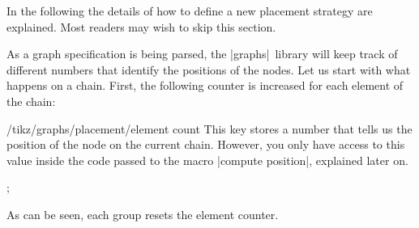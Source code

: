 In the following the details of how to define a new placement strategy are
explained. Most readers may wish to skip this section.

As a graph specification is being parsed, the |graphs| library will keep track
of different numbers that identify the positions of the nodes. Let us start
with what happens on a chain. First, the following counter is increased for
each element of the chain:
%
\begin{key}{/tikz/graphs/placement/element count}
    This key stores a number that tells us the position of the node on the
    current chain. However, you only have access to this value inside the code
    passed to the macro |compute position|, explained later on.
\begin{codeexample}[preamble={\usetikzlibrary{graphs}}]
\tikz {};
\end{codeexample}
    As can be seen, each group resets the element counter.
\end{key}

